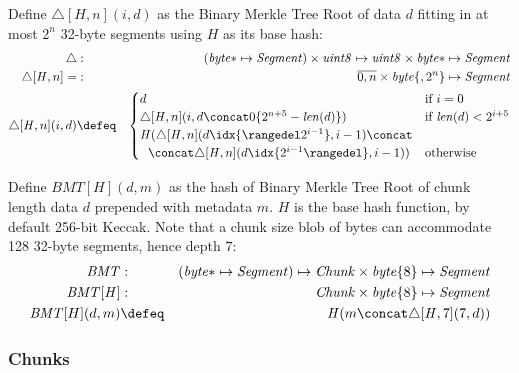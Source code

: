 \begin{definition}
\label{def:bmtroot}
Define  $\triangle[\mathit{H},n](i,d)$ as the Binary Merkle Tree Root of data $d$ fitting in at most $2^n$ 32-byte segments using $\mathit{H}$ as its base hash:
%
\begin{eqnarray}
\triangle&: &(\mathit{byte}{*}\mapsto\mathit{Segment})\times\mathit{uint8}\mapsto\mathit{uint8}\times\mathit{byte}{*} \mapsto \mathit{Segment} 
\\
\triangle[\mathit{H},n]=&:&\overline{0,n}\times\mathit{byte}\{,2^{n}\}\mapsto \mathit{Segment} \\
\triangle[\mathit{H},n](i,d) &\defeq &\begin{cases}d &\text{if }i=0
\\
\triangle[\mathit{H},n](i,d\concat 0\{2^{n+5}-\mathit{len}(d)\})& \text{if }\mathit{len}(d)<2^{i+5} \\
\mathit{H}(\triangle[\mathit{H},n](d\idx{\rangedel 2^{i-1}},i-1)\concat\\
\ \ \concat  \triangle[\mathit{H},n](d\idx{2^{i-1}\rangedel},i-1)) & \text{otherwise }
\end{cases}
\end{eqnarray}
\end{definition}

\begin{definition}
\label{def:bmt}
Define  $\mathit{BMT}[H](d,m)$ as the hash of Binary Merkle Tree Root of chunk length data $d$ prepended with metadata $m$.  $H$ is the base hash function, by default 256-bit Keccak. Note that a chunk size blob of bytes can accommodate 128 32-byte segments, hence  depth $7$:
%
\begin{eqnarray}
\mathit{BMT}&:&(\mathit{byte}{*}\mapsto\mathit{Segment})\mapsto  \mathit{Chunk}\times\mathit{byte}\{8\}\mapsto\mathit{Segment}\\
\mathit{BMT}[\mathit{H}] &:&\mathit{Chunk}\times\mathit{byte}\{8\}\mapsto\mathit{Segment}\\
\mathit{BMT}[H](d,m)&\defeq&\mathit{H}(m\concat \triangle[\mathit{H},7](7,d))
\end{eqnarray}

\end{definition}

\subsubsection{Chunks}

